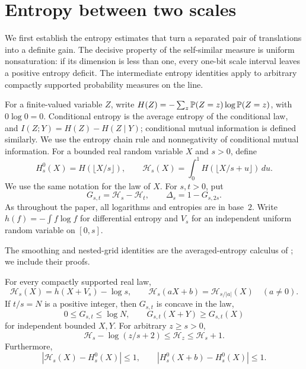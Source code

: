 \section{Entropy between two scales}\label{sec:entropy}

We first establish the entropy estimates that turn a separated pair of
translations into a definite gain.  The decisive property of the
self-similar measure is uniform nonsaturation: if its dimension is less
than one, every one-bit scale interval leaves a positive entropy deficit.
The intermediate entropy identities apply to arbitrary compactly
supported probability measures on the line.

For a finite-valued variable $Z$, write
$H(Z)=-\sum_z\P(Z=z)\log\P(Z=z)$, with $0\log0=0$.
Conditional entropy is the average entropy of the conditional law, and
$I(Z;Y)=H(Z)-H(Z\mid Y)$; conditional mutual information is defined
similarly. We use the entropy chain rule and nonnegativity of conditional
mutual information. For a bounded real random variable $X$ and $s>0$, define
\[
 H_s^0(X)=H(\lfloor X/s\rfloor),\qquad
 \mathcal H_s(X)=\int_0^1H(\lfloor X/s+u\rfloor)\,du.
\]
We use the same notation for the law of $X$.  For $s,t>0$, put
\[
 G_{s,t}=\mathcal H_s-\mathcal H_t,
 \qquad \Delta_s=1-G_{s,2s}.
\]
As throughout the paper, all logarithms and entropies are in base~$2$.
Write $h(f)=-\int f\log f$ for differential entropy and $V_s$ for an independent uniform
random variable on $[0,s]$.

The smoothing and nested-grid identities are the averaged-entropy calculus
of \cite[Section~2.2, Lemmas~5, 6, and~10]{VarjuAbsolute2019}; we include their proofs.

\begin{lemma}\label{lem:entropy-calculus}
For every compactly supported real law,
\begin{equation}\label{eq:entropy-smoothing}
 \mathcal H_s(X)=h(X+V_s)-\log s,
 \qquad
 \mathcal H_s(aX+b)=\mathcal H_{s/|a|}(X)
 \quad(a\ne0).
\end{equation}
If $t/s=N$ is a positive integer, then $G_{s,t}$ is concave in the law,
\begin{equation}\label{eq:entropy-integer-window}
 0\le G_{s,t}\le\log N,
 \qquad G_{s,t}(X+Y)\ge G_{s,t}(X)
\end{equation}
for independent bounded $X,Y$.  For arbitrary $z\ge s>0$,
\begin{equation}\label{eq:entropy-scale-comparison}
 \mathcal H_s-\log(z/s+2)\le\mathcal H_z\le\mathcal H_s+1.
\end{equation}
Furthermore,
\begin{equation}\label{eq:entropy-grid-comparison}
 |\mathcal H_s(X)-H_s^0(X)|\le1,
 \qquad |H_s^0(X+b)-H_s^0(X)|\le1.
\end{equation}
\end{lemma}


